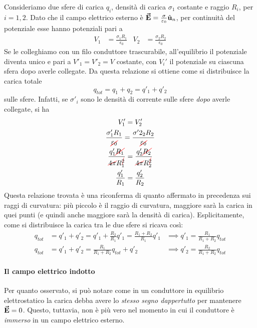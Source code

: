 \begin{itemize}
	\begin{example}
		Consideriamo due sfere di carica $q_i$, densità di carica $\sigma_1$ costante e raggio $R_i$, per $i = 1, 2$. Dato che il campo elettrico esterno è $\vb*{\va{E}}=\frac{\sigma}{\varepsilon_0}\hat{\mathbf{u}}_n$, per continuità del potenziale esse hanno potenziali pari a
		\begin{align*}
			V_1&=\frac{\sigma_1 R_1}{\epsilon_0} & V_2&=\frac{\sigma_2 R_2}{\epsilon_0}
		\end{align*}
		Se le colleghiamo con un filo conduttore trascurabile, all'equilibrio il potenziale diventa unico e pari a $V'_1=V'_2=V$ costante, con $V_i'$ il potenziale su ciascuna sfera dopo averle collegate. Da questa relazione si ottiene come si distribuisce la carica totale
		\begin{equation*}
			q_{tot}=q_1+q_2=q'_1+q'_2
		\end{equation*}
		sulle sfere. Infatti, se $\sigma'_i$ sono le densità di corrente sulle sfere \textit{dopo} averle collegate, si ha
		\begin{gather*}
			V'_1=V'_2\\
			\frac{\sigma'_1R_1}{\Ccancel[red]{\epsilon_0}}=\frac{\sigma'2_2R_2}{\Ccancel[red]{\epsilon_0}}\\
			\frac{q'_1\Ccancel[red]{R_1}}{\Ccancel[red]{4\pi} R_1^{\Ccancel[red]{2}}}=\frac{q'_2\Ccancel[red]{R_2}}{\Ccancel[red]{4\pi} R_2^{\Ccancel[red]{2}}}\\
			\frac{q'_1}{R_1}=\frac{q'_2}{R_2}
		\end{gather*}
		Questa relazione trovata è una riconferma di quanto affermato in precedenza sui raggi di curvatura: più piccolo è il raggio di curvatura, maggiore sarà la carica in quei punti (e quindi anche maggiore sarà la densità di carica). Esplicitamente, come si distribuisce la carica tra le due sfere si ricava così:
		\begin{align*}
			q_{tot}&=q'_1+q'_2=q'_1+\frac{R_2}{R_1}q'_1=\frac{R_1+R_2}{R_1}q'_1&\implies q'_1=\frac{R_1}{R_1+R_2}q_{tot}\\
			q_{tot}&=q'_1+q'_2=\frac{R_1}{R_1+R_2}q_{tot}+q'_2 &\implies q'_2=\frac{R_2}{R_1+R_2}q_{tot}
		\end{align*}
	\end{example}
\end{itemize}
\paragraph{Il campo elettrico indotto}
Per quanto osservato, si può notare come in un conduttore in equilibrio elettrostatico la carica debba avere lo \textit{stesso segno dappertutto} per mantenere $\vb*{\va{E}}=0$. Questo, tuttavia, non è più vero nel momento in cui il conduttore è \textit{immerso} in un campo elettrico esterno.

